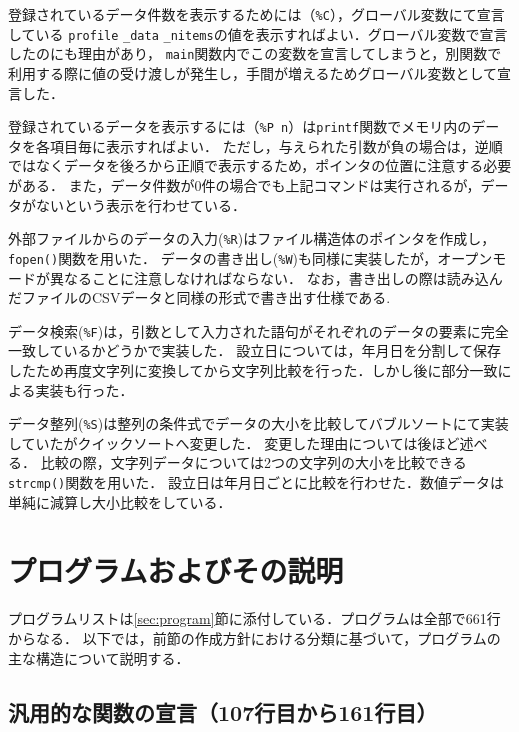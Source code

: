\documentclass[a4j,11pt]{jarticle}
\begin{document}
登録されているデータ件数を表示するためには（\verb|%C|），グローバル変数にて宣言している
\verb|profile| \verb|_data| \verb|_nitems|の値を表示すればよい．グローバル変数で宣言したのにも理由があり，
\verb|main|関数内でこの変数を宣言してしまうと，別関数で利用する際に値の受け渡しが発生し，手間が増えるためグローバル変数として宣言した．

登録されているデータを表示するには（\verb|%P n|）は\verb|printf|関数でメモリ内のデータを各項目毎に表示すればよい．
ただし，与えられた引数が負の場合は，逆順ではなくデータを後ろから正順で表示するため，ポインタの位置に注意する必要がある．
また，データ件数が0件の場合でも上記コマンドは実行されるが，データがないという表示を行わせている．

外部ファイルからのデータの入力(\verb|%R|)はファイル構造体のポインタを作成し，\verb|fopen()|関数を用いた．
データの書き出し(\verb|%W|)も同様に実装したが，オープンモードが異なることに注意しなければならない．
なお，書き出しの際は読み込んだファイルのCSVデータと同様の形式で書き出す仕様である.

データ検索(\verb|%F|)は，引数として入力された語句がそれぞれのデータの要素に完全一致しているかどうかで実装した．
設立日については，年月日を分割して保存したため再度文字列に変換してから文字列比較を行った．しかし後に部分一致による実装も行った．

データ整列(\verb|%S|)は整列の条件式でデータの大小を比較してバブルソートにて実装していたがクイックソートへ変更した．
変更した理由については後ほど述べる．
比較の際，文字列データについては2つの文字列の大小を比較できる\verb|strcmp()|関数を用いた．
設立日は年月日ごとに比較を行わせた．数値データは単純に減算し大小比較をしている．


\section{プログラムおよびその説明}\label{sec:explain}

プログラムリストは\ref{sec:program}節に添付している．プログラムは全部で661行からなる．
以下では，前節の作成方針における分類に基づいて，プログラムの主な構造について説明する．

\subsection{汎用的な関数の宣言（107行目から161行目）}
\end{document}
